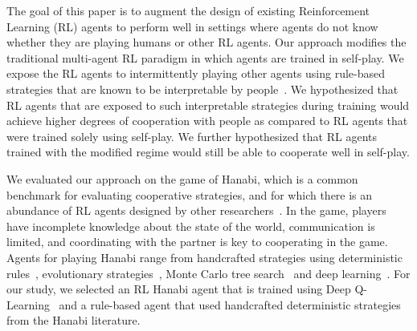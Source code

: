 \documentclass[letterpaper]{article} %
\begin{document}
The goal of this paper is to 
augment the design of existing    Reinforcement Learning (RL) agents to  perform well in settings where agents   do not know whether they are playing humans or other RL agents. %
Our approach modifies the traditional  multi-agent  RL  paradigm in which agents are  trained in self-play. We expose the RL agents to  intermittently playing other agents using   rule-based strategies that are known to be interpretable by people~\cite{lakkaraju2016interpretable}. We hypothesized that RL agents that are exposed to such interpretable strategies during training would achieve higher degrees of cooperation with people as compared to RL agents that were trained solely using self-play. We further hypothesized that RL agents trained with the modified regime would still be able to cooperate well in self-play. 

We evaluated our approach on the game of Hanabi, which is a common benchmark for evaluating cooperative strategies, and for which there is an abundance of RL agents designed by other researchers~\cite{bard2020hanabi}. 
  In the game, players have incomplete knowledge about  the state of the world,  communication is limited, and coordinating with the partner is key to cooperating in the game.  Agents for playing Hanabi range from handcrafted strategies
 using deterministic rules~\cite{osawa2015solving},     evolutionary strategies~\cite{canaan2018evolving},  Monte  Carlo tree search~\cite{walton2017evaluating,van2016aspects} and deep learning~\cite{bard2020hanabi}. 
 For our study, we selected an RL  Hanabi agent that is trained  using Deep Q-Learning~\cite{hessel2018rainbow}
 and a rule-based agent that used handcrafted deterministic  strategies from the Hanabi literature.
\end{document}
